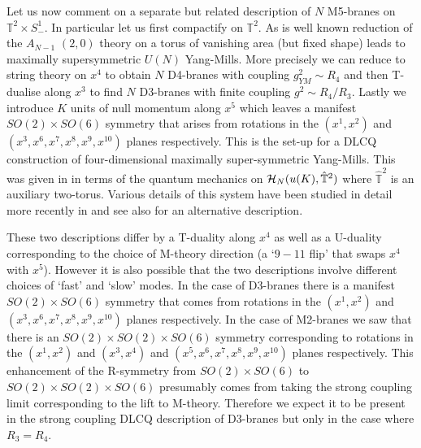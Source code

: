 \documentclass[12pt]{article}
\numberwithin{equation}{section}
\begin{document}
Let us now comment on a separate but related description of $N$ M5-branes on ${\mathbb T}^2\times S^1_-$. In particular let us first compactify on ${\mathbb T}^2$. As is well known reduction of the $A_{N-1}$ $(2,0)$ theory on a torus of vanishing area (but fixed shape) leads to maximally supersymmetric $U(N)$ Yang-Mills. More precisely we can reduce to string theory on $x^4$ to obtain $N$ D4-branes with coupling $g^2_{YM}\sim R_4$ and then T-dualise along $x^3$ to find $N$ D3-branes with finite coupling  $g^2 \sim R_4/R_3$.
Lastly we introduce $K$ units of null momentum along $x^5$ which leaves a manifest $SO(2)\times SO(6)$ symmetry that arises from rotations in the $(x^1,x^2)$ and $(x^3,x^6,x^7,x^8,x^9,x^{10})$ planes respectively. This is the set-up for a  DLCQ construction of four-dimensional maximally super-symmetric Yang-Mills.   This was given in \cite{Kapustin:1998pb} in terms of the quantum mechanics on ${\cal H}_N(u(K),\hat {\mathbb T}^2)$ where $\hat {\mathbb T}^2$ is an auxiliary two-torus.    Various details of this system have been studied in detail more recently in \cite{Dorey:2014dza} and see also \cite{Ganor:1997jx} for an alternative description.



 

These two descriptions differ by a T-duality along $x^4$ as well as a U-duality 
corresponding to the choice of M-theory direction (a `$9-11$ flip' that swaps $x^4$ with $x^5$). However it is also possible that the two descriptions involve different choices of `fast' and `slow' modes.  In the case of D3-branes there is a manifest $SO(2)\times SO(6)$ symmetry that comes from rotations in the $(x^1,x^2)$ and $(x^3,x^6,x^7,x^8,x^9,x^{10})$ planes respectively. In the case of M2-branes we saw that there is an $SO(2)\times SO(2)\times SO(6)$ symmetry corresponding to rotations in the $(x^1,x^2)$ and $(x^3,x^4)$ and $(x^5,x^6,x^7,x^8,x^9,x^{10})$  planes respectively. This enhancement of the R-symmetry from $SO(2)\times SO(6)$ to $SO(2)\times SO(2)\times SO(6)$ presumably comes from taking the strong coupling limit corresponding to the lift to M-theory. Therefore we expect it to be present in the strong coupling DLCQ description of D3-branes but only in the case where $R_3=R_4$.
\end{document}
